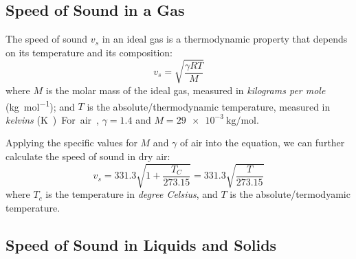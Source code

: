 \subsection{Speed of Sound in a Gas}
The speed of sound $v_s$ in an ideal gas is a thermodynamic property that
depends on its temperature and its composition:
\begin{equation}
  \boxed{
    v_s=\sqrt{\frac{\gamma RT}M}
  }
\end{equation}
where $M$ is the molar mass of the ideal gas, measured in
\emph{kilograms per mole} (\si{\kilo\gram\per\mol}); and $T$ is the
absolute/thermodynamic temperature, measured in \emph{kelvins} (\si\kelvin).
For air, $\gamma=1.4$ and $M=\SI{29e-3}{\kilo\gram\per\mol}$.


Applying the specific values for $M$ and $\gamma$ of air into the equation, we
can further calculate the speed of sound in dry air:
\begin{equation}
    \boxed{
      v_s=331.3\sqrt{1+\frac{T_C}{273.15}}=331.3\sqrt{\frac T{273.15}}
    }
\end{equation}
where $T_c$ is the temperature in \emph{degree Celsius}, and $T$ is the
absolute/termodyamic temperature.



\subsection{Speed of Sound in Liquids and Solids}

